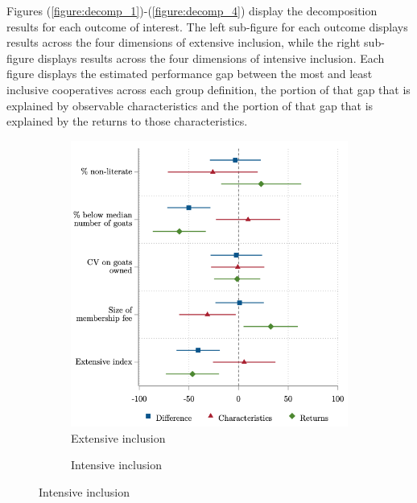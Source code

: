 \documentclass[11pt]{article}
\begin{document}
Figures (\ref{figure:decomp_1})-(\ref{figure:decomp_4}) display the decomposition results for each outcome of interest. The left sub-figure for each outcome displays results across the four dimensions of extensive inclusion, while the right sub-figure displays results across the four dimensions of intensive inclusion. Each figure displays the estimated performance gap between the most and least inclusive cooperatives across each group definition, the portion of that gap that is explained by observable characteristics and the portion of that gap that is explained by the returns to those characteristics. 

\vspace{.5cm}
\begin{figure}[H] 
\caption{Decomposition results for revenue from cooperative goat sales} \label{figure:decomp_1}
    \centering
    \begin{subfigure}[t]{.475\textwidth}
    \centering
        \caption{Extensive inclusion} \label{figure:decomp_1_ex}
        \includegraphics[width=\linewidth,trim=4 4 4 4,clip]{decomp_1_ex.png} 
    \end{subfigure}
    \vspace{.1cm}
    \begin{subfigure}[t]{0.47\textwidth}
        \centering
        \caption{Intensive inclusion} \label{figure:decomp_1_in}

\end{subfigure}
\end{figure}
\end{document}
